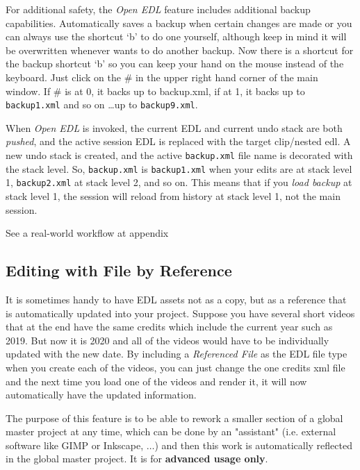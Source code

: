 For additional safety, the \textit{Open EDL} feature includes
additional backup capabilities. Automatically \CGG{} saves a backup
when certain changes are made or you can always use the shortcut `b'
to do one yourself, although keep in mind it will be overwritten
whenever \CGG{} wants to do another backup.  Now there is a shortcut
for the backup shortcut `b' so you can keep your hand on the mouse
instead of the keyboard.  Just click on the \# in the upper right
hand corner of the main window.  If \# is at 0, it backs up to
backup.xml, if at 1, it backs up to \texttt{backup1.xml} and so on
\dots up to \texttt{backup9.xml}.

When \textit{Open EDL} is invoked, the current EDL and current undo
stack are both \textit{pushed}, and the active session EDL is
replaced with the target clip/nested edl.  A new undo stack is
created, and the active \texttt{backup.xml} file name is decorated
with the stack level.  So, \texttt{backup.xml} is
\texttt{backup1.xml} when your edits are at stack level 1,
\texttt{back\-up2\-.xml} at stack level 2, and so on.  This means
that if you \textit{load backup} at stack level 1, the session will
reload from history at stack level 1, not the main session.

See a real-world workflow at appendix 

\subsection{Editing with File by Reference}%
\label{sub:file-reference}

It is sometimes handy to have EDL assets not as a copy, but as a
reference that is automatically updated into your project.  Suppose
you have several short videos that at the end have the same credits
which include the current year such as 2019.  But now it is 2020 and
all of the videos would have to be individually updated with the new
date.  By including a \textit{Referenced File} as the EDL file type
when you create each of the videos, you can just change the one
credits xml file and the next time you load one of the videos and
render it, it will now automatically have the updated information.

The purpose of this feature is to be able to rework a smaller
section of a global master project at any time, which can be done by
an "assistant" (i.e. external software like GIMP or Inkscape, $\dots$) and then this work is automatically reflected in the
global master project.  It is for \textbf{advanced usage only}.

